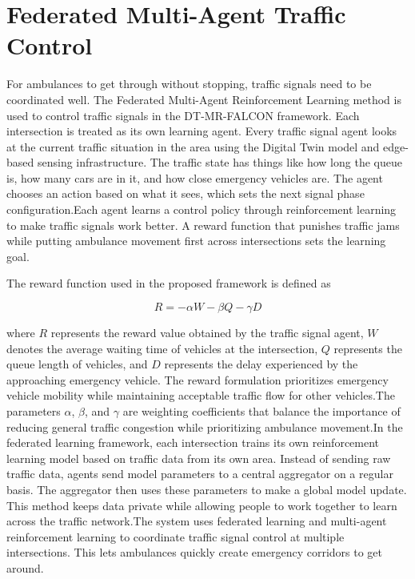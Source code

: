 \documentclass[conference]{IEEEtran}
\begin{document}
\section{Federated Multi-Agent Traffic Control}
For ambulances to get through without stopping, traffic signals need to be coordinated well. The Federated Multi-Agent Reinforcement Learning method is used to control traffic signals in the DT-MR-FALCON framework. Each intersection is treated as its own learning agent.
Every traffic signal agent looks at the current traffic situation in the area using the Digital Twin model and edge-based sensing infrastructure. The traffic state has things like how long the queue is, how many cars are in it, and how close emergency vehicles are. The agent chooses an action based on what it sees, which sets the next signal phase configuration.Each agent learns a control policy through reinforcement learning to make traffic signals work better. A reward function that punishes traffic jams while putting ambulance movement first across intersections sets the learning goal.

The reward function used in the proposed framework is defined as

\begin{equation}
R = -\alpha W - \beta Q - \gamma D
\end{equation}

where $R$ represents the reward value obtained by the traffic signal agent, $W$ denotes the average waiting time of vehicles at the intersection, $Q$ represents the queue length of vehicles, and $D$ represents the delay experienced by the approaching emergency vehicle.
The reward formulation prioritizes emergency vehicle mobility while maintaining acceptable traffic flow for other vehicles.The parameters $\alpha$, $\beta$, and $\gamma$ are weighting coefficients that balance the importance of reducing general traffic congestion while prioritizing ambulance movement.In the federated learning framework, each intersection trains its own reinforcement learning model based on traffic data from its own area. Instead of sending raw traffic data, agents send model parameters to a central aggregator on a regular basis. The aggregator then uses these parameters to make a global model update. This method keeps data private while allowing people to work together to learn across the traffic network.The system uses federated learning and multi-agent reinforcement learning to coordinate traffic signal control at multiple intersections. This lets ambulances quickly create emergency corridors to get around.
\end{document}
